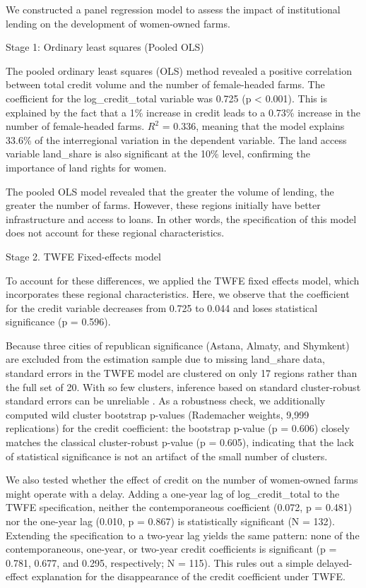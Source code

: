 ﻿\documentclass[pdflatex,sn-mathphys-ay]{sn-jnl}
\newif\ifrevmarks
\newcommand{\rev}[1]{\ifrevmarks\textcolor{red}{#1}\else#1\fi}
\begin{document}
We constructed a panel regression model to assess the impact of
institutional lending on the development of women-owned farms.

Stage 1: Ordinary least squares (Pooled OLS)

The pooled ordinary least squares (OLS) method revealed a positive
correlation between total credit volume and the number of female-headed
farms. The coefficient for the log\_credit\_total variable was 0.725 (p
\textless{} 0.001). This is explained by the fact that a 1\% increase in
credit leads to a 0.73\% increase in the number of female-headed farms.
$R^2$ = 0.336, meaning that the model explains 33.6\% of the interregional
variation in the dependent variable. The land access variable
land\_share is also significant at the 10\% level, confirming the
importance of land rights for women.

The pooled OLS model revealed that the greater the volume of lending,
the greater the number of farms. However, these regions initially have
better infrastructure and access to loans. In other
words, the specification of this model does not account for these
regional characteristics.

Stage 2. TWFE Fixed-effects model

To account for these differences, we applied the TWFE fixed effects
model, which incorporates these regional characteristics. Here, we
observe that the coefficient for the credit variable decreases from
0.725 to 0.044 and loses statistical significance (p = 0.596).

\rev{Because three cities of republican significance (Astana, Almaty,
and Shymkent) are excluded from the estimation sample due to missing
land\_share data, standard errors in the TWFE model are clustered on
only 17 regions rather than the full set of 20. With so few clusters,
inference based on standard cluster-robust standard errors can be
unreliable \citep{ref107}. As a robustness check, we additionally
computed wild cluster bootstrap p-values (Rademacher weights, 9,999
replications) for the credit coefficient: the bootstrap p-value (p =
0.606) closely matches the classical cluster-robust p-value (p =
0.605), indicating that the lack of statistical significance is not an
artifact of the small number of clusters.}

\rev{We also tested whether the effect of credit on the number of
women-owned farms might operate with a delay. Adding a one-year lag of
log\_credit\_total to the TWFE specification, neither the
contemporaneous coefficient (0.072, p = 0.481) nor the one-year lag
(0.010, p = 0.867) is statistically significant (N = 132). Extending
the specification to a two-year lag yields the same pattern: none of
the contemporaneous, one-year, or two-year credit coefficients is
significant (p = 0.781, 0.677, and 0.295, respectively; N = 115). This
rules out a simple delayed-effect explanation for the disappearance of
the credit coefficient under TWFE.}
\end{document}
